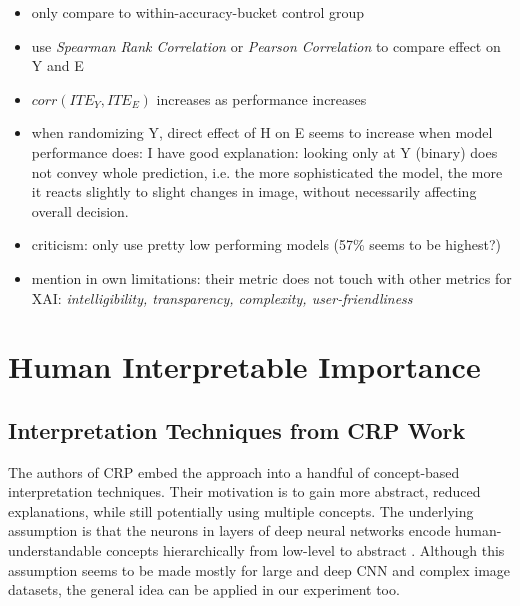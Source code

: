 \begin{itemize}
    \item only compare to within-accuracy-bucket control group
    \item use \textit{Spearman Rank Correlation} or \textit{Pearson Correlation} to compare effect on Y and E
    \item $corr(ITE_Y, ITE_E)$ increases as performance increases
    \item when randomizing Y, direct effect of H on E seems to increase when model performance does: I have good explanation: looking only at Y (binary) does not convey whole prediction, i.e. the more sophisticated the model, the more it reacts slightly to slight changes in image, without necessarily affecting overall decision.
    \item criticism: only use pretty low performing models (57\% seems to be highest?)
    \item mention in own limitations: their metric does not touch with other metrics for XAI: \textit{intelligibility, transparency, complexity, user-friendliness}
\end{itemize}


\section{Human Interpretable Importance}
\subsection{Interpretation Techniques from CRP Work}
The authors of CRP embed the approach into a handful of concept-based interpretation techniques. Their motivation is to gain more abstract, reduced explanations, while still potentially using multiple concepts. The underlying assumption is that the neurons in layers of deep neural networks encode human-understandable concepts hierarchically from low-level to abstract \cite{Zeiler2013,Bau2017,Olah2017}. Although this assumption seems to be made mostly for large and deep CNN and complex image datasets, the general idea can be applied in our experiment too. 

